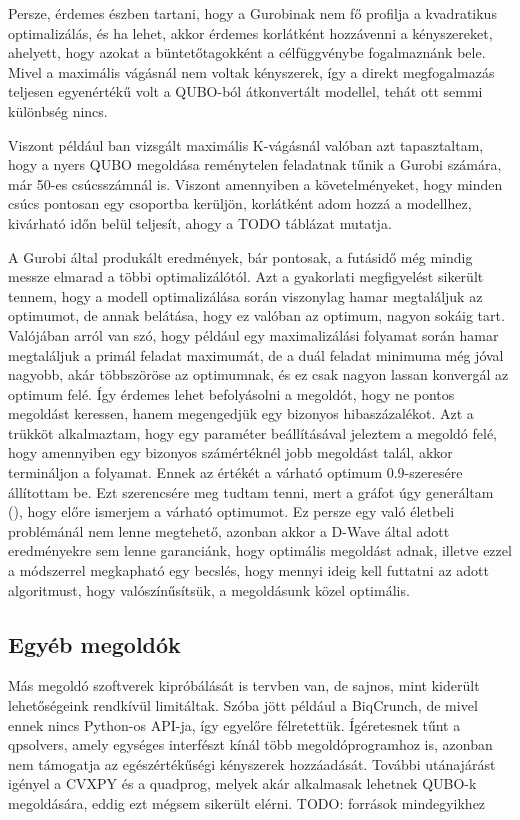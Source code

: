 Persze, érdemes észben tartani, hogy a Gurobinak nem fő profilja a kvadratikus optimalizálás, és ha lehet, akkor érdemes korlátként hozzávenni a kényszereket, ahelyett, hogy azokat a büntetőtagokként a célfüggvénybe fogalmaznánk bele. Mivel a maximális vágásnál nem voltak kényszerek, így a direkt megfogalmazás teljesen egyenértékű volt a QUBO-ból átkonvertált modellel, tehát ott semmi különbség nincs.

Viszont például ban vizsgált maximális K-vágásnál valóban azt tapasztaltam, hogy a nyers QUBO megoldása reménytelen feladatnak tűnik a Gurobi számára, már 50-es csúcsszámnál is. Viszont amennyiben a követelményeket, hogy minden csúcs pontosan egy csoportba kerüljön, korlátként adom hozzá a modellhez, kivárható időn belül teljesít, ahogy a TODO táblázat mutatja.

A Gurobi által produkált eredmények, bár pontosak, a futásidő még mindig messze elmarad a többi optimalizálótól. Azt a gyakorlati megfigyelést sikerült tennem, hogy a modell optimalizálása során viszonylag hamar megtaláljuk az optimumot, de annak belátása, hogy ez valóban az optimum, nagyon sokáig tart. 
Valójában arról van szó, hogy például egy maximalizálási folyamat során hamar megtaláljuk a primál feladat maximumát, de a duál feladat minimuma még jóval nagyobb, akár többszöröse az optimumnak, és ez csak nagyon lassan konvergál az optimum felé. Így érdemes lehet befolyásolni a megoldót, hogy ne pontos megoldást keressen, hanem megengedjük egy bizonyos hibaszázalékot. Azt a trükköt alkalmaztam, hogy egy paraméter beállításával jeleztem a megoldó felé, hogy amennyiben egy bizonyos számértéknél jobb megoldást talál, akkor termináljon a folyamat\cite{gurobiBestObjStop}. Ennek az értékét a várható optimum 0.9-szeresére állítottam be. Ezt szerencsére meg tudtam tenni, mert a gráfot úgy generáltam (), hogy előre ismerjem a várható optimumot. Ez persze egy való életbeli problémánál nem lenne megtehető, azonban akkor a D-Wave által adott eredményekre sem lenne garanciánk, hogy optimális megoldást adnak, illetve ezzel a módszerrel megkapható egy becslés, hogy mennyi ideig kell futtatni az adott algoritmust, hogy valószínűsítsük, a megoldásunk közel optimális.

\subsection{Egyéb megoldók}\label{sec:practiceOthers}

Más megoldó szoftverek kipróbálását is tervben van, de sajnos, mint kiderült lehetőségeink rendkívül limitáltak. Szóba jött például a BiqCrunch, de mivel ennek nincs Python-os API-ja, így egyelőre félretettük. Ígéretesnek tűnt a qpsolvers, amely egységes interfészt kínál több megoldóprogramhoz is, azonban nem támogatja az egészértékűségi kényszerek hozzáadását. További utánajárást igényel a CVXPY és a quadprog, melyek akár alkalmasak lehetnek QUBO-k megoldására, eddig ezt mégsem sikerült elérni. TODO: források mindegyikhez

